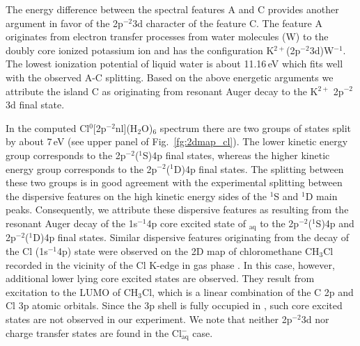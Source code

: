 The energy difference between the spectral features A and C provides another argument in favor of the 2p$^{-2}$3d character of the feature C. The feature A originates from electron transfer processes from water molecules (W) to the doubly core ionized potassium ion and has the configuration K$^{2+}$(2p$^{-2}$3d)W$^{-1}$. The lowest ionization potential of liquid water is about 11.16\,eV \cite{winter04:2625} which fits well with the observed A-C splitting. Based on the above energetic arguments we attribute the island C as originating from resonant Auger decay to the K$^{2+}$ 2p$^{-2}$3d final state.


In the computed Cl$^{0}$[2p$^{-2}$nl](H$_2$O)$_6$ spectrum there are two groups of states split by about 7\,eV (see upper panel of Fig.\ \ref{fg:2dmap_cl}). The lower kinetic energy group corresponds to the 2p$^{-2}$($^1$S)4p final states, whereas the higher kinetic energy group corresponds to the 2p$^{-2}$($^1$D)4p final states. The splitting between these two groups is in good agreement with the experimental splitting between the dispersive features on the high kinetic energy sides of the $^1$S and $^1$D main peaks. Consequently, we attribute these dispersive features as resulting from the resonant Auger decay of the 1s$^{-1}$4p core excited state of \cli$_{\text{aq}}$ to the 2p$^{-2}$($^1$S)4p and  2p$^{-2}$($^1$D)4p final states. Similar dispersive features originating from the decay of the Cl (1s$^{-1}$4p) state were observed on the 2D map of chloromethane CH$_3$Cl recorded in the vicinity of the Cl K-edge in gas phase \cite{gold16:133001}. In this case, however, additional lower lying core excited states are observed. They result from excitation to the LUMO of CH$_3$Cl, which is a linear combination of the C 2p and Cl 3p atomic orbitals. Since the 3p shell is fully occupied in \cli, such core excited states are not observed in our experiment. We note that neither 2p$^{-2}$3d nor charge transfer states are found in the Cl$^{-}_{\text{aq}}$ case.


